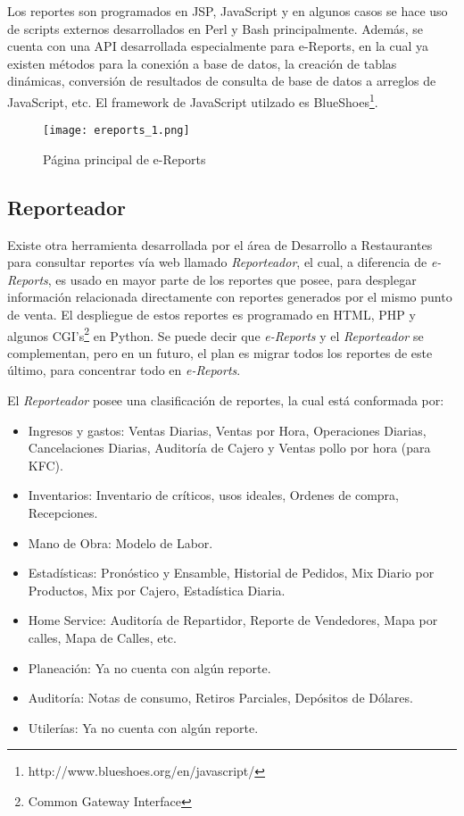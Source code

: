 Los reportes son programados en JSP, JavaScript y en algunos casos se hace uso de scripts externos desarrollados en Perl y Bash principalmente. Además, se cuenta con una API desarrollada especialmente para e-Reports, en la cual ya existen métodos para la conexión a base de datos, la creación de tablas dinámicas, conversión de resultados de consulta de base de datos a arreglos de JavaScript, etc. El framework de JavaScript utilzado es BlueShoes\footnote{http://www.blueshoes.org/en/javascript/}.

\begin{figure}[htb]
 \begin{center}
  \texttt{[image: ereports\_1.png]}
 \end{center}
 \caption{Página principal de e-Reports}
 \label{fig:ereports}
\end{figure}

\subsection{Reporteador}
\label{sec:reporteador}

Existe otra herramienta desarrollada por el área de Desarrollo a Restaurantes para consultar reportes vía web llamado \textit{Reporteador}, el cual, a diferencia de \textit{e-Reports}, es usado en mayor parte de los reportes que posee, para desplegar información relacionada directamente con reportes generados por el mismo punto de venta. El despliegue de estos reportes es programado en HTML, PHP y algunos CGI's\footnote{Common Gateway Interface} en Python. Se puede decir que \textit{e-Reports} y el \textit{Reporteador} se complementan, pero en un futuro, el plan es migrar todos los reportes de este último, para concentrar todo en \textit{e-Reports}.

El \textit{Reporteador} posee una clasificación de reportes, la cual está conformada por:

\begin{itemize}
 \item Ingresos y gastos: Ventas Diarias, Ventas por Hora, Operaciones Diarias, Cancelaciones Diarias, Auditoría de Cajero y Ventas pollo por hora (para KFC).
 \item Inventarios: Inventario de críticos, usos ideales, Ordenes de compra, Recepciones.
 \item Mano de Obra: Modelo de Labor.
 \item Estadísticas: Pronóstico y Ensamble, Historial de Pedidos, Mix Diario por Productos, Mix por Cajero, Estadística Diaria.
 \item Home Service: Auditoría de Repartidor, Reporte de Vendedores, Mapa por calles, Mapa de Calles, etc.
 \item Planeación: Ya no cuenta con algún reporte.
 \item Auditoría: Notas de consumo, Retiros Parciales, Depósitos de Dólares.
 \item Utilerías: Ya no cuenta con algún reporte.
\end{itemize}

